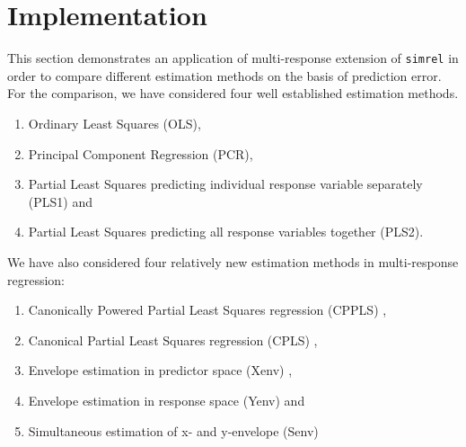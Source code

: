 \documentclass[review]{elsarticle}
\providecommand{\tightlist}{%
  \setlength{\itemsep}{0pt}\setlength{\parskip}{0pt}}
\theoremstyle{definition}
\theoremstyle{definition}
\theoremstyle{definition}
\theoremstyle{remark}
\begin{document}
\hypertarget{implementation}{\section{Implementation}\label{implementation}}

This section demonstrates an application of multi-response extension of
\texttt{simrel} in order to compare different estimation methods on the
basis of prediction error. For the comparison, we have considered four
well established estimation methods.

\begin{enumerate}
\def\labelenumi{\alph{enumi})}
\tightlist
\item
  Ordinary Least Squares (OLS),
\item
  Principal Component Regression (PCR),
\item
  Partial Least Squares predicting individual response variable
  separately (PLS1) and
\item
  Partial Least Squares predicting all response variables together
  (PLS2).
\end{enumerate}

We have also considered four relatively new estimation methods in
multi-response regression:

\begin{enumerate}
\def\labelenumi{\alph{enumi})}
\tightlist
\item
  Canonically Powered Partial Least Squares regression (CPPLS)
  \citep{indahl2009canonical},
\item
  Canonical Partial Least Squares regression (CPLS)
  \citep{indahl2009canonical},
\item
  Envelope estimation in predictor space (Xenv)
  \citep{cook2010envelope},
\item
  Envelope estimation in response space (Yenv)
  \citep{cook2015foundations} and
\item
  Simultaneous estimation of x- and y-envelope (Senv)
  \citep{cook2015simultaneous}
\end{enumerate}
\end{document}

